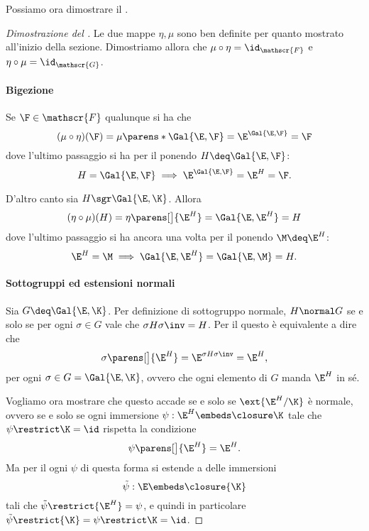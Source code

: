 Possiamo ora dimostrare il .
\begin{proof}[Dimostrazione del ]
    Le due mappe $\eta, \mu$ sono ben definite per quanto mostrato all'inizio della sezione. Dimostriamo allora che $\mu \circ \eta = \id_{\mathscr{F}}$ e $\eta \circ \mu = \id_{\mathscr{G}}$. 

    \paragraph{Bigezione}    
    Se $\F \in \mathscr{F}$ qualunque si ha che \[
        (\mu \circ \eta)(\F) = \mu\parens*{\Gal{\E, \F}} = \E^{\Gal{\E, \F}} = \F
    \] dove l'ultimo passaggio si ha per il  ponendo $H \deq \Gal{\E, \F}$: \[
        H = \Gal{\E, \F} \implies \E^{\Gal{\E, \F}} = \E^H = \F.
    \]

    D'altro canto sia $H \sgr \Gal{\E, \K}$. Allora \[
        (\eta \circ \mu)(H) = \eta\parens[\big]{\E^H} = \Gal{\E, \E^H} = H
    \] dove l'ultimo passaggio si ha ancora una volta per il  ponendo $\M \deq \E^H$: \[
        \E^H = \M \implies \Gal{\E, \E^H} = \Gal{\E, \M} = H.
    \]
    \paragraph{Sottogruppi ed estensioni normali}
    Sia $G \deq \Gal{\E, \K}$. Per definizione di sottogruppo normale, $H \normal G$ se e solo se per ogni $\sigma \in G$ vale che $\sigma H\sigma\inv = H$. Per il  questo è equivalente a dire che \[
        \sigma\parens[\big]{\E^H} = \E^{\sigma H \sigma\inv} = \E^H,
    \] per ogni $\sigma \in G = \Gal{\E, \K}$, ovvero che ogni elemento di $G$ manda $\E^H$ in sé.
    
    Vogliamo ora mostrare che questo accade se e solo se $\ext{\E^H / \K}$ è normale, ovvero se e solo se ogni immersione $\psi : \E^H \embeds \closure\K$ tale che $\psi\restrict\K = \id$ rispetta la condizione \[
        \psi\parens[\big]{\E^H} = \E^H.
    \] Ma per il  ogni $\psi$ di questa forma si estende a delle immersioni \[
        \tilde\psi : \E \embeds \closure{\K}
    \] tali che $\tilde\psi\restrict{\E^H} = \psi$, e quindi in particolare $\tilde\psi\restrict{\K} = \psi\restrict\K = \id$.
    

\end{proof}
